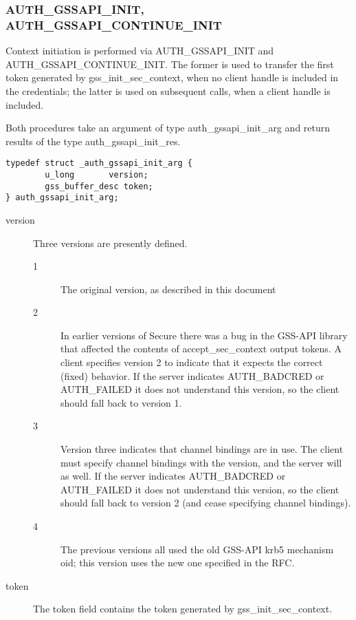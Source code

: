 \subsubsection{AUTH_GSSAPI_INIT, AUTH_GSSAPI_CONTINUE_INIT}

Context initiation is performed via AUTH_GSSAPI_INIT and
AUTH_GSSAPI_CONTINUE_INIT.  The former is used to transfer the first
token generated by gss_init_sec_context, when no client handle is
included in the credentials; the latter is used on subsequent calls,
when a client handle is included.

Both procedures take an argument of type auth_gssapi_init_arg and
return results of the type auth_gssapi_init_res.

\begin{verbatim}
typedef struct _auth_gssapi_init_arg {
        u_long       version;
        gss_buffer_desc token;
} auth_gssapi_init_arg;
\end{verbatim}

\begin{description}
\item[version]  Three versions are presently defined.

\begin{description}
\item[1] The original version, as described in this document

\item[2] In earlier versions of Secure there was a bug in the GSS-API
library that affected the contents of accept_sec_context output
tokens.  A client specifies version 2 to indicate that it expects the
correct (fixed) behavior.  If the server indicates AUTH_BADCRED or
AUTH_FAILED it does not understand this version, so the client should
fall back to version 1.

\item[3] Version three indicates that channel bindings are in use.
The client must specify channel bindings with the version, and the
server will as well.  If the server indicates AUTH_BADCRED or
AUTH_FAILED it does not understand this version, so the client should
fall back to version 2 (and cease specifying channel bindings).

\item[4] The previous versions all used the old GSS-API krb5 mechanism
oid; this version uses the new one specified in the RFC.  
\end{description}

\item[token] The token field contains the token generated by
gss_init_sec_context.
\end{description}

